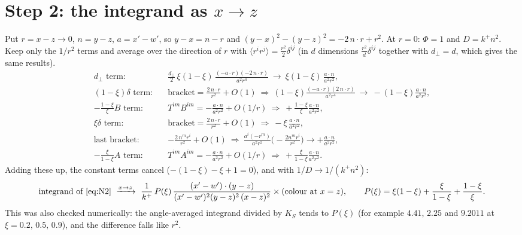 \documentclass[10pt]{article}
\numberwithin{equation}{section}
\begin{document}
\section{Step 2: the integrand as $x\to z$}
Put $r=x-z\to0$, $n=y-z$, $a=x'-w'$, so $y-x=n-r$ and $(y-x)^{2}-(y-z)^{2}=-2\,n\cdot r+r^{2}$. At $r=0$: $\Phi=1$ and $D=k^{+}n^{2}$. Keep only the $1/r^{2}$ terms and average over the direction of $r$ with $\langle r^{i}r^{j}\rangle=\frac{r^{2}}{2}\delta^{ij}$ (in $d$ dimensions $\frac{r^{2}}{d}\delta^{ij}$ together with $d_{\perp}=d$, which gives the same results).
\begin{align}
\text{$d_{\perp}$ term:}\quad& \frac{d_{\perp}}{2}\,\xi(1-\xi)\,\frac{(-a\cdot r)(-2\,n\cdot r)}{a^{2}r^{4}}\ \to\ \xi(1-\xi)\,\frac{a\cdot n}{a^{2}r^{2}},\\
\text{$(1-\xi)\delta$ term:}\quad& \text{bracket}=\frac{2\,n\cdot r}{r^{2}}+O(1)\ \Rightarrow\ (1-\xi)\frac{(-a\cdot r)(2\,n\cdot r)}{a^{2}r^{4}}\ \to\ -(1-\xi)\frac{a\cdot n}{a^{2}r^{2}},\\
\text{$-\tfrac{1-\xi}{\xi}B$ term:}\quad& T^{im}B^{im}=-\frac{a\cdot n}{a^{2}r^{2}}+O(1/r)\ \Rightarrow\ +\frac{1-\xi}{\xi}\frac{a\cdot n}{a^{2}r^{2}},\\
\text{$\xi\delta$ term:}\quad& \text{bracket}=\frac{2\,n\cdot r}{r^{2}}+O(1)\ \Rightarrow\ -\xi\,\frac{a\cdot n}{a^{2}r^{2}},\\
\text{last bracket:}\quad& -\frac{2\,n^{m}r^{i}}{r^{2}}+O(1)\ \Rightarrow\ \frac{a^{i}(-r^{m})}{a^{2}r^{2}}\Big(-\frac{2n^{m}r^{i}}{r^{2}}\Big)\to+\frac{a\cdot n}{a^{2}r^{2}},\\
\text{$-\tfrac{\xi}{1-\xi}A$ term:}\quad& T^{im}A^{im}=-\frac{a\cdot n}{a^{2}r^{2}}+O(1/r)\ \Rightarrow\ +\frac{\xi}{1-\xi}\frac{a\cdot n}{a^{2}r^{2}}.
\end{align}
Adding these up, the constant terms cancel ($-(1-\xi)-\xi+1=0$), and with $1/D\to1/(k^{+}n^{2})$:
\begin{equation}
\text{integrand of \eqref{eq:N2}}\ \xrightarrow{x\to z}\ \frac{1}{k^{+}}\,P(\xi)\,\frac{(x'-w')\cdot(y-z)}{(x'-w')^{2}(y-z)^{2}\,(x-z)^{2}}\times(\text{colour at }x=z),\qquad P(\xi)=\xi(1-\xi)+\frac{\xi}{1-\xi}+\frac{1-\xi}{\xi}.
\label{eq:limit}
\end{equation}
This was also checked numerically: the angle-averaged integrand divided by $K_{S}$ tends to $P(\xi)$ (for example $4.41$, $2.25$ and $9.2011$ at $\xi=0.2,\,0.5,\,0.9$), and the difference falls like $r^{2}$.
\end{document}
